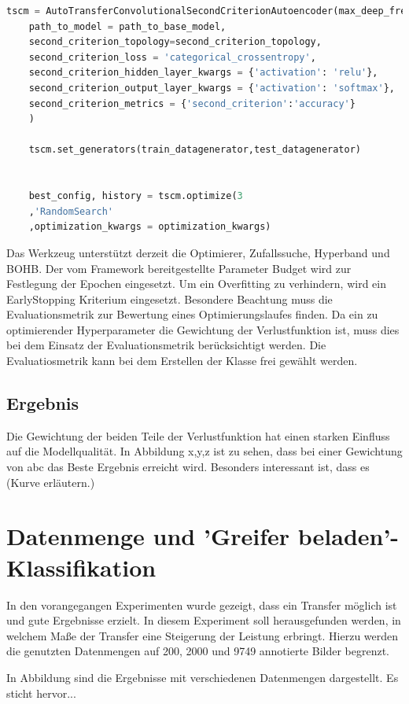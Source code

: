 	\begin{lstlisting}[language=python,caption=Beispiel AutoTransferSecondCriterionAutoenocder in Python, label=lst:BspAutoTransferSecondCriterionAutoenocder]
	tscm = AutoTransferConvolutionalSecondCriterionAutoencoder(max_deep_freeze=2,
	path_to_model = path_to_base_model,            
	second_criterion_topology=second_criterion_topology,
	second_criterion_loss = 'categorical_crossentropy',                                                                                                   
	second_criterion_hidden_layer_kwargs = {'activation': 'relu'},
	second_criterion_output_layer_kwargs = {'activation': 'softmax'},
	second_criterion_metrics = {'second_criterion':'accuracy'}
	)
	
	tscm.set_generators(train_datagenerator,test_datagenerator)
	
	
	best_config, history = tscm.optimize(3
	,'RandomSearch'
	,optimization_kwargs = optimization_kwargs)
	\end{lstlisting}
	Das Werkzeug unterstützt derzeit die Optimierer, Zufallssuche, Hyperband und BOHB. Der vom Framework bereitgestellte Parameter Budget wird zur Festlegung der Epochen eingesetzt. Um ein Overfitting zu verhindern, wird ein EarlyStopping Kriterium eingesetzt. 
	Besondere Beachtung muss die Evaluationsmetrik zur Bewertung eines Optimierungslaufes finden. Da ein zu optimierender Hyperparameter die Gewichtung der Verlustfunktion ist, muss dies bei dem Einsatz der Evaluationsmetrik berücksichtigt werden. Die Evaluatiosmetrik kann bei dem Erstellen der Klasse frei gewählt werden.
	
	\subsection{Ergebnis}
	Die Gewichtung der beiden Teile der Verlustfunktion hat einen starken Einfluss auf die Modellqualität. In Abbildung x,y,z  ist zu sehen, dass bei einer Gewichtung von abc das Beste Ergebnis erreicht wird. Besonders interessant ist, dass es  (Kurve erläutern.)
	
	
	\section{Datenmenge und 'Greifer beladen'-Klassifikation}
		In den vorangegangen Experimenten wurde gezeigt, dass ein Transfer möglich ist und gute Ergebnisse erzielt. In diesem Experiment soll herausgefunden werden, in welchem Maße der Transfer eine Steigerung der Leistung erbringt. Hierzu werden die genutzten Datenmengen auf 200, 2000 und 9749 annotierte Bilder begrenzt.
		
		In Abbildung  sind die Ergebnisse mit verschiedenen Datenmengen dargestellt. Es sticht hervor... 
		
			
		
		
		
		
		
		
		
		
		
		
		
		
		
		
		
		
		
			
		
		
		
		
		
		
		
	
	